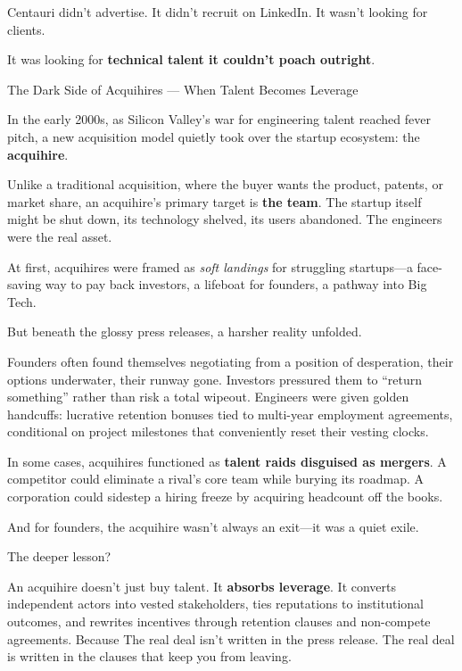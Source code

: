 Centauri didn’t advertise. It didn’t recruit on LinkedIn. It wasn’t looking for clients.

It was looking for \textbf{technical talent it couldn’t poach outright}.


\medskip

\begin{HistoricalSidebar}{The Dark Side of Acquihires --- When Talent Becomes Leverage}

  In the early 2000s, as Silicon Valley’s war for engineering talent reached fever pitch, a new acquisition model 
  quietly took over the startup ecosystem: the \textbf{acquihire}.

  \medskip
  
  Unlike a traditional acquisition, where the buyer wants the product, patents, or market share, an acquihire’s primary 
  target is \textbf{the team}. The startup itself might be shut down, its technology shelved, its users abandoned. The 
  engineers were the real asset.

  \medskip
  
  At first, acquihires were framed as \textit{soft landings} for struggling startups—a face-saving way to pay back 
  investors, a lifeboat for founders, a pathway into Big Tech.

  \medskip
  
  But beneath the glossy press releases, a harsher reality unfolded.

  \medskip
  
  Founders often found themselves negotiating from a position of desperation, their options underwater, their runway gone. 
  Investors pressured them to “return something” rather than risk a total wipeout. Engineers were given golden handcuffs: 
  lucrative retention bonuses tied to multi-year employment agreements, conditional on project milestones that conveniently 
  reset their vesting clocks.

  \medskip
  
  In some cases, acquihires functioned as \textbf{talent raids disguised as mergers}. A competitor could eliminate a rival’s 
  core team while burying its roadmap. A corporation could sidestep a hiring freeze by acquiring headcount off the books.

  \medskip
  
  And for founders, the acquihire wasn’t always an exit—it was a quiet exile.
  
  \medskip
  
  The deeper lesson?

  \medskip
  
  An acquihire doesn’t just buy talent. It \textbf{absorbs leverage}. It converts independent actors into vested stakeholders, 
  ties reputations to institutional outcomes, and rewrites incentives through retention clauses and non-compete agreements.
  Because The real deal isn’t written in the press release.  The real deal is written in the clauses that keep you from leaving.
  
\end{HistoricalSidebar}

